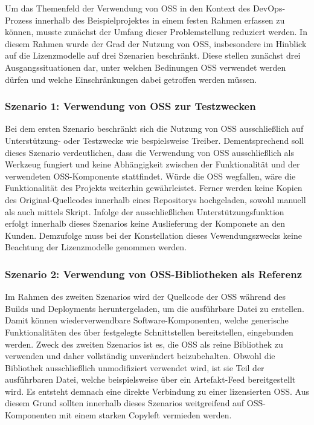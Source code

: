 Um das Themenfeld der Verwendung von OSS in den Kontext des DevOps-Prozess innerhalb des Beispielprojektes in einem festen Rahmen erfassen zu können, musste zunächst der Umfang dieser Problemstellung reduziert werden. In diesem Rahmen wurde der Grad der Nutzung von OSS, insbesondere im Hinblick auf die Lizenzmodelle auf drei Szenarien beschränkt. Diese stellen zunächst drei Ausgangssituationen dar, unter welchen Bedinungen OSS verwendet werden dürfen und welche Einschränkungen dabei getroffen werden müssen.   

\subsubsection{Szenario 1: Verwendung von OSS zur Testzwecken}

Bei dem ersten Szenario beschränkt sich die Nutzung von OSS ausschließlich auf Unterstützung- oder Testzwecke wie bespielsweise Treiber. Dementsprechend soll dieses Szenario verdeutlichen, dass die Verwendung von OSS ausschließlich als Werkzeug fungiert und keine Abhängigkeit zwischen der Funktionalität und der verwendeten OSS-Komponente stattfindet. Würde die OSS wegfallen, wäre die Funktionalität des Projekts weiterhin gewährleistet. Ferner werden keine Kopien des Original-Quellcodes innerhalb eines Repositorys hochgeladen, sowohl manuell als auch mittels Skript. Infolge der ausschließlichen Unterstützungsfunktion erfolgt innerhalb dieses Szenarios keine Auslieferung der Komponete an den Kunden. Demzufolge muss bei der Konstellation dieses Vewendungszwecks keine Beachtung der Lizenzmodelle genommen werden. 

\subsubsection{Szenario 2: Verwendung von OSS-Bibliotheken als Referenz}

Im Rahmen des zweiten Szenarios wird der Quellcode der OSS während des Builds und Deployments heruntergeladen, um die ausführbare Datei zu erstellen. Damit können wiederverwendbare Software-Komponenten, welche generische Funktionalitäten des über festgelegte Schnittstellen bereitstellen, eingebunden werden. Zweck des zweiten Szenarios ist es, die OSS als reine Bibliothek zu verwenden und daher vollständig unverändert beizubehalten. Obwohl die Bibliothek ausschließlich unmodifiziert verwendet wird, ist sie Teil der ausführbaren Datei, welche beispielsweise über ein Artefakt-Feed bereitgestellt wird. Es entsteht demnach eine direkte Verbindung zu einer lizensierten OSS. Aus diesem Grund sollten innerhalb dieses Szenarios weitgreifend auf OSS-Komponenten mit einem starken Copyleft vermieden werden. 

